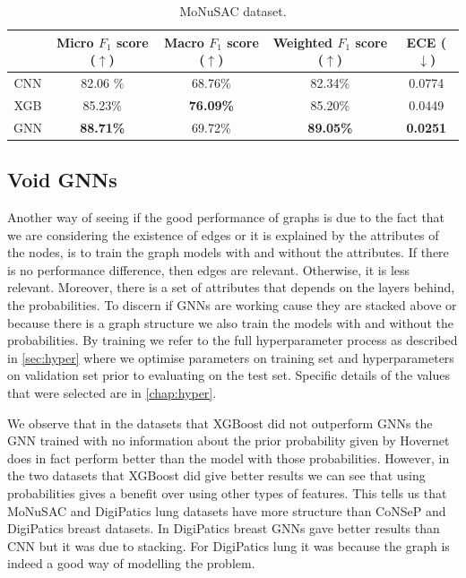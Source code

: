 \begin{table}[ht]
\vspace{0.5cm}

\begin{tabular}{c|c|c|c|c|}
  \cline{2-5}
  & Micro $F_1$ score ($\uparrow$) & Macro $F_1$ score ($\uparrow$) & Weighted $F_1$ score ($\uparrow$) & ECE ($\downarrow$) \\ \hline
  \multicolumn{1}{|c|}{CNN}  & 82.06 \% & 68.76\% & 82.34\% & 0.0774 \\ \hline
\multicolumn{1}{|c|}{XGB}  & 85.23\% & \textbf{76.09\%} & 85.20\% & 0.0449 \\ \hline
\multicolumn{1}{|c|}{GNN}  & \textbf{88.71\%} & 69.72\% & \textbf{89.05\%} & \textbf{0.0251} \\ \hline
\end{tabular}
\caption{MoNuSAC dataset.}
    \label{tab:gnn-xgb}
\end{table}

\newpage
\subsection{Void GNNs}

Another way of seeing if the good performance of graphs is due to the fact that we are considering the existence of edges or it is explained by the attributes of the nodes, is to train the graph models with and without the attributes. If there is no performance difference, then edges are relevant. Otherwise, it is less relevant. Moreover, there is a set of attributes that depends on the layers behind, the probabilities. To discern if GNNs are working cause they are stacked above or because there is a graph structure we also train the models with and without the probabilities. By training we refer to the full hyperparameter process as described in \autoref{sec:hyper} where we optimise parameters on training set and hyperparameters on validation set prior to evaluating on the test set. Specific details of the values that were selected are in \autoref{chap:hyper}.

We observe that in the datasets that XGBoost did not outperform GNNs the GNN trained with no information about the prior probability given by Hovernet does in fact perform better than the model with those probabilities. However, in the two datasets that XGBoost did give better results we can see that using probabilities gives a benefit over using other types of features. This tells us that MoNuSAC and DigiPatics lung datasets have more structure than CoNSeP and DigiPatics breast datasets. In DigiPatics breast GNNs gave better results than CNN but it was due to stacking. For DigiPatics lung it was because the graph is indeed a good way of modelling the problem. 

